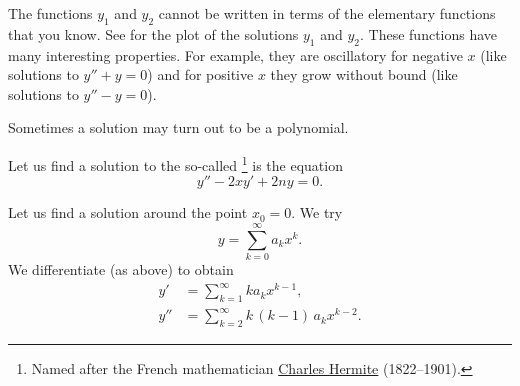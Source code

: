 \documentclass[12pt]{book}
\begin{document}
The functions $y_1$ and $y_2$ cannot be written in terms of the elementary
functions that you know.  See  for the plot of
the solutions $y_1$ and $y_2$.  These functions have many interesting
properties.  For example, they are oscillatory for negative $x$
(like solutions to $y''+y=0$) and
for positive $x$ they grow without bound (like solutions to $y''-y=0$).

\medskip

Sometimes a solution may turn out to be a polynomial.

\begin{example}
Let us find a solution to the so-called
\emph{}%
\footnote{Named after the French mathematician
\href{http://en.wikipedia.org/wiki/Hermite}{Charles Hermite}
(1822--1901).} is the equation
\begin{equation*}
y'' -2xy' + 2n y = 0 .
\end{equation*}

Let us find a solution around the point $x_0 = 0$.
We try
\begin{equation*}
y = \sum_{k=0}^\infty a_k x^k .
\end{equation*}
We differentiate (as above) to obtain
\begin{align*}
y' &= \sum_{k=1}^\infty k a_k x^{k-1} ,
\\
y'' &= \sum_{k=2}^\infty k\,(k-1) \, a_k x^{k-2} .
\end{align*}


\end{example}
\end{document}
